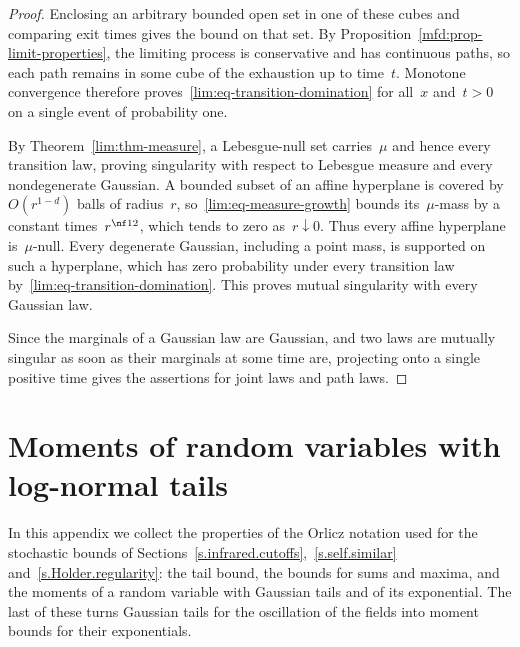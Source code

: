 \documentclass[11pt]{amsart}
\begin{document}
\begin{proof}
\smallskip

Enclosing an arbitrary bounded open set in one of these cubes and comparing exit times gives the bound on that set. By Proposition~\ref{mfd:prop-limit-properties}, the limiting process is conservative and has continuous paths, so each path remains in some cube of the exhaustion up to time~$t$. Monotone convergence therefore proves~\eqref{lim:eq-transition-domination} for all~$x$ and~$t>0$ on a single event of probability one.

\smallskip

By Theorem~\ref{lim:thm-measure}, a Lebesgue-null set carries~$\mu$ and hence every transition law, proving singularity with respect to Lebesgue measure and every nondegenerate Gaussian. A bounded subset of an affine hyperplane is covered by~$O(r^{1-d})$ balls of radius~$r$, so~\eqref{lim:eq-measure-growth} bounds its~$\mu$-mass by a constant times~$r^{\nf12}$, which tends to zero as~$r\downarrow0$. Thus every affine hyperplane is~$\mu$-null. Every degenerate Gaussian, including a point mass, is supported on such a hyperplane, which has zero probability under every transition law by~\eqref{lim:eq-transition-domination}. This proves mutual singularity with every Gaussian law.

\smallskip

Since the marginals of a Gaussian law are Gaussian, and two laws are mutually singular as soon as their marginals at some time are, projecting onto a single positive time gives the assertions for joint laws and path laws.
\end{proof}

\clearpage \appendix

\section{Moments of random variables with log-normal tails}
\label{s.orlicz}

In this appendix we collect the properties of the Orlicz notation used for the stochastic bounds of Sections~\ref{s.infrared.cutoffs},~\ref{s.self.similar} and~\ref{s.Holder.regularity}: the tail bound, the bounds for sums and maxima, and the moments of a random variable with Gaussian tails and of its exponential. The last of these turns Gaussian tails for the oscillation of the fields into moment bounds for their exponentials.

\smallskip
\end{document}
